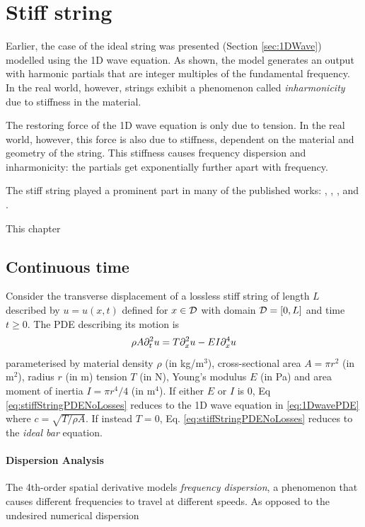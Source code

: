 \chapter{Stiff string}\label{ch:stiffString}
Earlier, the case of the ideal string was presented (Section \ref{sec:1DWave}) modelled using the 1D wave equation. As shown, the model generates an output with harmonic partials that are integer multiples of the fundamental frequency. In the real world, however, strings exhibit a phenomenon called \textit{inharmonicity} due to stiffness in the material. 

The restoring force of the 1D wave equation is only due to tension. In the real world, however, this force is also due to stiffness, dependent on the material and geometry of the string. This stiffness causes frequency dispersion and inharmonicity: the partials get exponentially further apart with frequency. 

The stiff string played a prominent part in many of the published works:
\citeP[A], \citeP[B], \citeP[C], \citeP[D] and \citeP[E]. 

This chapter 

\section{Continuous time}
Consider the transverse displacement of a lossless stiff string of length $L$ described by $u=u(x,t)$ defined for $x\in \mathcal{D}$ with domain $\mathcal{D} = [0, L]$ and time $t\geq 0$. The PDE describing its motion is 
\begin{equation}\label{eq:stiffStringPDENoLosses}
    \rho A \partial_t^2 u = T \partial_x^2 u - EI \partial_x^4 u
\end{equation}
parameterised by material density $\rho$ (in kg/m$^3$), cross-sectional area $A = \pi r^2$ (in m$^2$), radius $r$ (in m) tension $T$ (in N), Young's modulus $E$ (in Pa) and area moment of inertia $I = \pi r^4/4$ (in m$^4$). If either $E$ or $I$ is 0, Eq \eqref{eq:stiffStringPDENoLosses} reduces to the 1D wave equation in \eqref{eq:1DwavePDE} where $c = \sqrt{T/\rho A}$. If instead $T = 0$, Eq. \eqref{eq:stiffStringPDENoLosses} reduces to the \textit{ideal bar} equation.


\subsubsection{Dispersion Analysis}
The 4th-order spatial derivative models \textit{frequency dispersion}, a phenomenon that causes different frequencies to travel at different speeds. As opposed to the undesired numerical dispersion 

